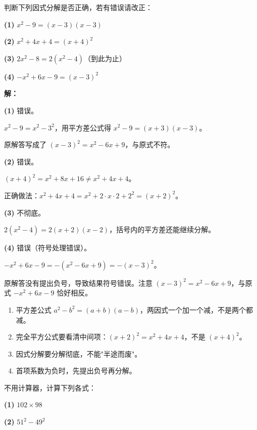 \documentclass[12pt, a4paper]{ctexart}
\begin{document}
\begin{examplebox}
判断下列因式分解是否正确，若有错误请改正：

\textbf{(1)} $x^2 - 9 = (x - 3)(x - 3)$

\textbf{(2)} $x^2 + 4x + 4 = (x + 4)^2$

\textbf{(3)} $2x^2 - 8 = 2(x^2 - 4)$（到此为止）

\textbf{(4)} $-x^2 + 6x - 9 = (x - 3)^2$
\end{examplebox}

\textbf{解：}

\textbf{(1)} 错误。

$x^2 - 9 = x^2 - 3^2$，用平方差公式得 $x^2 - 9 = (x+3)(x-3)$。

原解答写成了 $(x-3)^2 = x^2 - 6x + 9$，与原式不符。

\medskip
\textbf{(2)} 错误。

$(x+4)^2 = x^2 + 8x + 16 \neq x^2 + 4x + 4$。

正确做法：$x^2 + 4x + 4 = x^2 + 2 \cdot x \cdot 2 + 2^2 = (x+2)^2$。

\medskip
\textbf{(3)} 不彻底。

$2(x^2 - 4) = 2(x+2)(x-2)$，括号内的平方差还能继续分解。

\medskip
\textbf{(4)} 错误（符号处理错误）。

$-x^2 + 6x - 9 = -(x^2 - 6x + 9) = -(x - 3)^2$。

原解答没有提出负号，导致结果符号错误。注意 $(x-3)^2 = x^2 - 6x + 9$，与原式 $-x^2 + 6x - 9$ 恰好相反。

\begin{warnbox}[易错提醒总结]
\begin{enumerate}[nosep]
  \item 平方差公式 $a^2 - b^2 = (a+b)(a-b)$，两因式一个加一个减，不是两个都减。
  \item 完全平方公式要看清中间项：$(x+2)^2 = x^2 + 4x + 4$，不是 $(x+4)^2$。
  \item 因式分解要分解彻底，不能"半途而废"。
  \item 首项系数为负时，先提出负号再分解。
\end{enumerate}
\end{warnbox}

\begin{examplebox}
不用计算器，计算下列各式：

\textbf{(1)} $102 \times 98$

\textbf{(2)} $51^2 - 49^2$
\end{examplebox}
\end{document}
